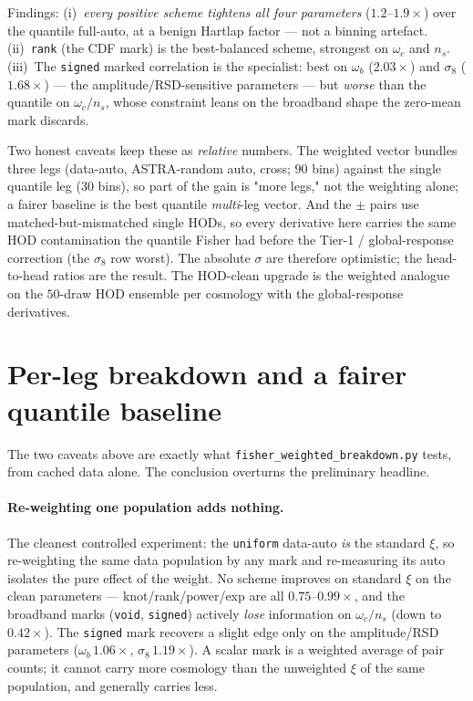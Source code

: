 \documentclass[11pt]{article}
\newcommand{\code}[1]{\texttt{#1}}
\newcommand{\xifull}{\xi}
\begin{document}
Findings: (i)~\emph{every positive scheme tightens all four parameters}
($1.2$--$1.9\times$) over the quantile full-auto, at a benign Hartlap factor ---
not a binning artefact.  (ii)~\code{rank} (the CDF mark) is the best-balanced
scheme, strongest on $\omega_c$ and $n_s$.  (iii)~The \code{signed} marked
correlation is the specialist: best on $\omega_b$ ($2.03\times$) and $\sigma_8$
($1.68\times$) --- the amplitude/RSD-sensitive parameters --- but \emph{worse} than
the quantile on $\omega_c/n_s$, whose constraint leans on the broadband shape the
zero-mean mark discards.

Two honest caveats keep these as \emph{relative} numbers.  The weighted vector
bundles three legs (data-auto, ASTRA-random auto, cross; $90$ bins) against the
single quantile leg ($30$ bins), so part of the gain is "more legs," not the
weighting alone; a fairer baseline is the best quantile \emph{multi}-leg vector.
And the $\pm$ pairs use matched-but-mismatched single HODs, so every derivative
here carries the same HOD contamination the quantile Fisher had before the Tier-1 /
global-response correction (the $\sigma_8$ row worst).  The absolute $\sigma$ are
therefore optimistic; the head-to-head ratios are the result.  The HOD-clean
upgrade is the weighted analogue on the $50$-draw HOD ensemble per cosmology with
the global-response derivatives.

\section{Per-leg breakdown and a fairer quantile baseline}
The two caveats above are exactly what \code{fisher\_weighted\_breakdown.py}
tests, from cached data alone.  The conclusion overturns the preliminary headline.

\paragraph{Re-weighting one population adds nothing.}  The cleanest controlled
experiment: the \code{uniform} data-auto \emph{is} the standard $\xifull$, so
re-weighting the same data population by any mark and re-measuring its auto isolates
the pure effect of the weight.  No scheme improves on standard $\xi$ on the clean
parameters --- knot/rank/power/exp are all $0.75$--$0.99\times$, and the broadband
marks (\code{void}, \code{signed}) actively \emph{lose} information on $\omega_c/n_s$
(down to $0.42\times$).  The \code{signed} mark recovers a slight edge only on the
amplitude/RSD parameters ($\omega_b\,1.06\times$, $\sigma_8\,1.19\times$).  A scalar
mark is a weighted average of pair counts; it cannot carry more cosmology than the
unweighted $\xi$ of the same population, and generally carries less.
\end{document}
